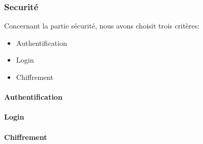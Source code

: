 \subsubsection{Securité}

Concernant la partie sécurité, nous avons choisit trois critères:
\begin{itemize}
 	\item Authentification
	\item Login
	\item Chiffrement

\end{itemize}

\paragraph{Authentification}
\paragraph{Login}
\paragraph{Chiffrement}